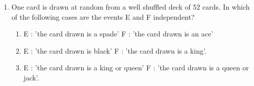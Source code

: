 \renewcommand{\theequation}{\theenumi}
\begin{enumerate}[label=\thesection.\arabic*.,ref=\thesection.\theenumi]
\item One card is drawn at random from a well
shuffled deck of 52 cards. In which of the
following cases are the events E and F
independent?
\begin{enumerate}
\item E : ’the card drawn is a spade’ F : ’the
card drawn is an ace’
\item E : ’the card drawn is black’ F : ’the card
drawn is a king’.
\item E : ’the card drawn is a king or queen’ F
: ’the card drawn is a queen or jack’.
\end{enumerate}

\end{enumerate}